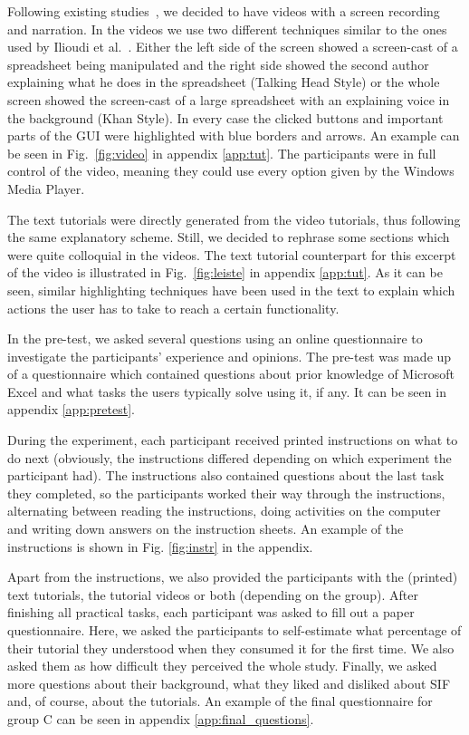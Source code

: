 Following existing studies~\cite{plaisant, mestre, lloyd, howto}, we decided to have videos with a screen recording and narration.
In the videos we use two different techniques similar to the ones used by Ilioudi et al.~\cite{videos}. Either the left side of the screen showed a screen-cast of a spreadsheet being manipulated and the right side showed the second author explaining what he does in the spreadsheet (Talking Head Style) or the whole screen showed the screen-cast of a large spreadsheet with an explaining voice in the background (Khan Style). In every case the clicked buttons and important parts of the GUI were highlighted with blue borders and arrows. An example can be seen in Fig.~\ref{fig:video} in appendix \ref{app:tut}. The participants were in full control of the video, meaning they could use every  option given by the Windows Media Player. 




The text tutorials were directly generated from the video tutorials, thus following the same explanatory scheme. 
Still, we decided to rephrase some sections which were quite colloquial in the videos. 
The text tutorial counterpart for this excerpt of the video is illustrated in Fig.~\ref{fig:leiste} in appendix \ref{app:tut}. As it can be seen, similar highlighting techniques have been used in the text to explain which actions the user has to take to reach a certain functionality.


In the pre-test, we asked several questions using an online questionnaire to investigate the participants' experience and opinions. The pre-test was made up of a questionnaire which contained questions about prior knowledge of Microsoft Excel and what tasks the users typically solve using it, if any. It can be seen in appendix \ref{app:pretest}. 

During the experiment, each participant received printed instructions on what to do next (obviously, the instructions differed depending on which experiment the participant had). The instructions also contained questions about the last task they completed, so the participants worked their way through the instructions, alternating between reading the instructions, doing activities on the computer and writing down answers on the instruction sheets. An example of the instructions is shown in Fig. \ref{fig:instr} in the appendix.

Apart from the instructions, we also provided the participants with the (printed) text tutorials, the tutorial videos or both (depending on the group). After finishing all practical tasks, each participant was asked to fill out a paper questionnaire. Here, we asked the participants to self-estimate what percentage of their tutorial they understood when they consumed it for the first time. We also asked them as how difficult they perceived the whole study. Finally, we asked more questions about their background, what they liked and disliked about SIF and, of course, about the tutorials. An example of the final questionnaire for group C can be seen in appendix \ref{app:final_questions}.

